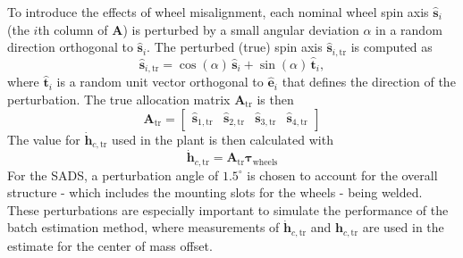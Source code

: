  To introduce the effects of wheel misalignment, each nominal wheel spin axis $\hat{\bm{s}}_i$ (the $i$th column of $\bm{A}$) is perturbed by a small angular deviation $\alpha$ in a random direction orthogonal to $\hat{\bm{s}}_i$. The perturbed (true) spin axis $\hat{\bm{s}}_{i,\text{tr}}$ is computed as
\begin{equation}\label{equation:wheel_perturb}
    \hat{\bm{s}}_{i,\text{tr}} = 
    \cos(\alpha)\,\hat{\bm{s}}_i 
    + \sin(\alpha)\,\hat{\bm{t}}_i,
\end{equation}
where $\hat{\bm{t}}_i$ is a random unit vector orthogonal to $\hat{\bm{e}}_i$ that defines the direction of the perturbation. The true allocation matrix $\bm{A}_\text{tr}$ is then
\begin{equation}
    \bm{A}_\text{tr}=\begin{bmatrix}
        \hat{\bm{s}}_{1,\text{tr}} & \hat{\bm{s}}_{2,\text{tr}} & \hat{\bm{s}}_{3,\text{tr}} & \hat{\bm{s}}_{4,\text{tr}}
    \end{bmatrix}
\end{equation}
The value for $\dot{\bm{h}}_{c,\text{tr}}$ used in the plant is then calculated with
\begin{equation}
    \dot{\bm{h}}_{c,\text{tr}} = \bm{A}_\text{tr}\bm{\tau}_\text{wheels}
\end{equation}
For the SADS, a perturbation angle of $1.5^{\circ}$ is chosen to account for the overall structure - which includes the mounting slots for the wheels - being welded. These perturbations are especially important to simulate the performance of the batch estimation method, where measurements of $\dot{\bm{h}}_{c,\text{tr}}$ and $\bm{h}_{c,\text{tr}}$ are used in the estimate for the center of mass offset.  
